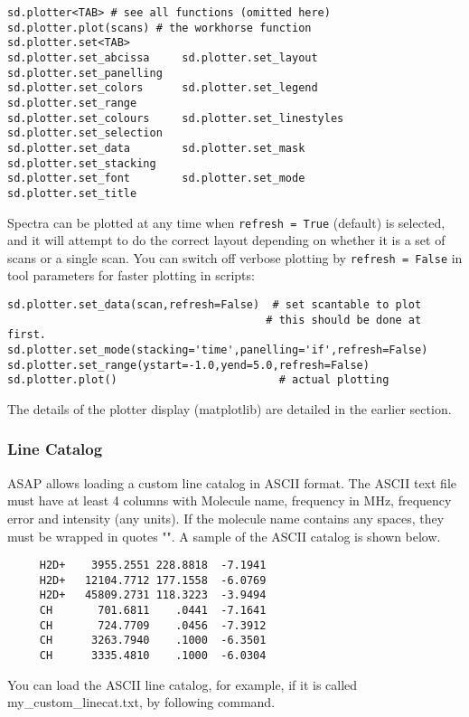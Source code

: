 \small
\begin{verbatim}
sd.plotter<TAB> # see all functions (omitted here)
sd.plotter.plot(scans) # the workhorse function
sd.plotter.set<TAB>
sd.plotter.set_abcissa     sd.plotter.set_layout      sd.plotter.set_panelling
sd.plotter.set_colors      sd.plotter.set_legend      sd.plotter.set_range
sd.plotter.set_colours     sd.plotter.set_linestyles  sd.plotter.set_selection
sd.plotter.set_data        sd.plotter.set_mask        sd.plotter.set_stacking
sd.plotter.set_font        sd.plotter.set_mode        sd.plotter.set_title
\end{verbatim}
\normalsize

Spectra can be plotted at any time when {\tt refresh = True} (default) is
selected, and it will attempt to do the correct layout depending on
whether it is a set of scans or a single scan. 
You can switch off verbose plotting by {\tt refresh = False} in
tool parameters for faster plotting in scripts: 


\begin{verbatim}
sd.plotter.set_data(scan,refresh=False)  # set scantable to plot
                                        # this should be done at first.
sd.plotter.set_mode(stacking='time',panelling='if',refresh=False)
sd.plotter.set_range(ystart=-1.0,yend=5.0,refresh=False)
sd.plotter.plot()                         # actual plotting
\end{verbatim}

The details of the plotter display (matplotlib) are detailed in
the earlier section.

\subsubsection{Line Catalog}
ASAP allows loading a custom line catalog in ASCII format.
The ASCII text file must have at least 4 columns with Molecule name, 
frequency in MHz, frequency error and intensity (any units).
If the molecule name contains any spaces, they must be wrapped in quotes "".
A sample of the ASCII catalog is shown below.

\small
\begin{verbatim}
     H2D+    3955.2551 228.8818  -7.1941  
     H2D+   12104.7712 177.1558  -6.0769  
     H2D+   45809.2731 118.3223  -3.9494  
     CH       701.6811    .0441  -7.1641  
     CH       724.7709    .0456  -7.3912  
     CH      3263.7940    .1000  -6.3501  
     CH      3335.4810    .1000  -6.0304
\end{verbatim}
\normalsize
You can load the ASCII line catalog, for example, if
it is called my\_custom\_linecat.txt,
by following command.

